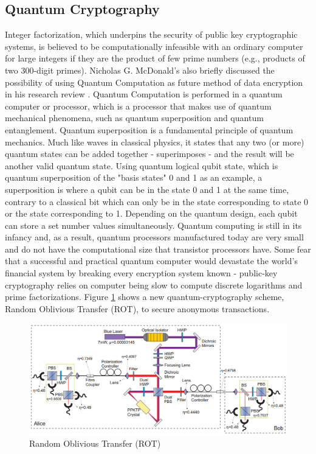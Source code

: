 \documentclass[journal]{IEEEtran}
\begin{document}
\subsection{\textbf{Quantum Cryptography}}
Integer factorization, which underpins the security of public key cryptographic systems, is believed to be computationally infeasible with an ordinary computer for large integers if they are the product of few prime numbers (e.g., products of two 300-digit primes). Nicholas G. McDonald's also briefly discussed the possibility of using Quantum Computation as future method of data encryption in his research review \cite{encryption_research}. Quantum Computation is performed in a quantum computer or processor, which is a processor that makes use of quantum mechanical phenomena, such as quantum superposition and quantum entanglement. Quantum superposition is a fundamental principle of quantum mechanics. Much like waves in classical physics, it states that any two (or more) quantum states can be added together - superimposes - and the result will be another valid quantum state. Using quantum logical qubit state, which is quantum superposition of the "basis states" 0 and 1 as an example, a superposition is where a qubit can be in the state 0 and 1 at the same time, contrary to a classical bit which can only be in the state corresponding to state 0 or the state corresponding to 1. Depending on the quantum design, each qubit can store a set number values simultaneously. Quantum computing is still in its infancy and, as a result, quantum processors manufactured today are very small and do not have the computational size that transistor processors have. Some fear that a successful and practical quantum computer would devastate the world's financial system by breaking every encryption system known - public-key cryptography relies on computer being slow to compute discrete logarithms and prime factorizations. Figure \ref{fig:rot} shows a new quantum-cryptography scheme, Random Oblivious Transfer (ROT), to secure anonymous transactions.

\newline
\begin{figure}[!h]
    \centering
    \includegraphics[scale=.3]{ROT-experiment}
    \caption{Random Oblivious Transfer (ROT)}
    \label{fig:rot}
\end{figure}
\end{document}
